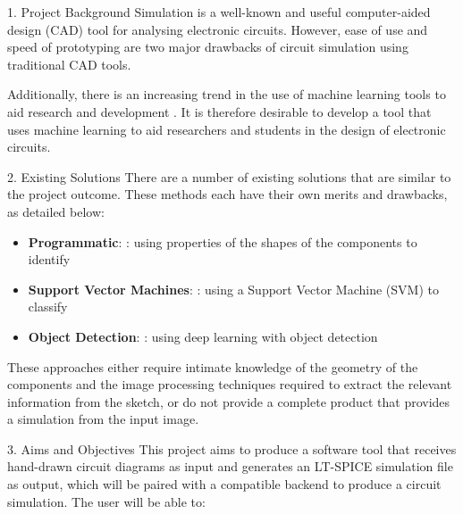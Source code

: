 \documentclass{beamer}
\date{\today}
\begin{document}
\begin{frame}[t]
  \begin{columns}[t]

    \separatorcolumn

    \begin{column}{\colwidth}
      \begin{block}{1. Project Background}
        Simulation is a well-known and useful computer-aided design (CAD) tool for
        analysing electronic circuits. However, ease of use and speed of prototyping
        are two major drawbacks of circuit simulation using traditional CAD tools.

        Additionally, there is an increasing trend in the use of machine learning
        tools to aid research and development \cite{review/Moreno-Garcia2019}. It
        is therefore desirable to develop a tool that uses machine learning to aid
        researchers and students in the design of electronic circuits.
      \end{block}

      \begin{block}{2. Existing Solutions}
        There are a number of existing solutions that are similar to the project
        outcome. These methods each have their own merits and drawbacks, as detailed
        below:

        \begin{itemize}
          \item \textbf{Programmatic}:
                \cite{alg/Shane2009}: using properties of the shapes of the components to identify
          \item \textbf{Support Vector Machines}:
                \cite{svm/Chen2019}: using a Support Vector Machine (SVM) to classify
          \item \textbf{Object Detection}: \cite{dl/Rachala2022,dl/Dey2021}: using deep learning with object detection
        \end{itemize}

        These approaches either require intimate knowledge of the geometry of the components
        and the image processing techniques required to extract the relevant information
        from the sketch, or do not provide a complete product that provides a simulation from
        the input image.
      \end{block}

      \begin{block}{3. Aims and Objectives}
        This project aims to produce a software tool that receives hand-drawn
        circuit diagrams as input and generates an LT-SPICE simulation file as output,
        which will be paired with a compatible backend to produce a circuit simulation.
        The user will be able to:


\end{block}
\end{column}
\end{columns}
\end{frame}
\end{document}
